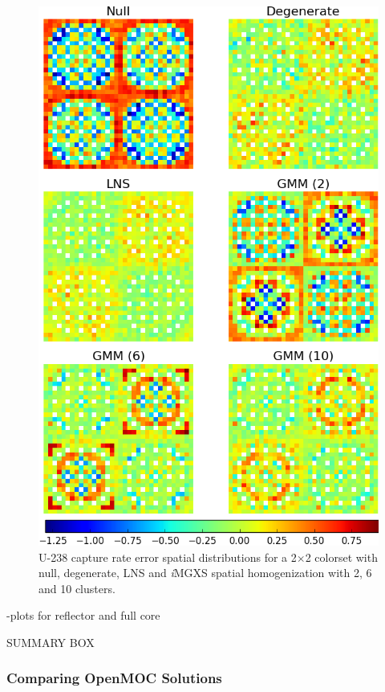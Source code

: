 \begin{figure}[h!]
\centering
\includegraphics[width=0.9\linewidth]{figures/results/spatial/2x2/capt-err}
\vspace{2mm}
\caption[U-238 capture rate errors for a 2$\times$2 colorset]{U-238 capture rate error spatial distributions for a 2$\times$2 colorset with null, degenerate, \ac{LNS} and \textit{i}\ac{MGXS} spatial homogenization with 2, 6 and 10 clusters.}
\label{fig:chap11-2x2-capt-rates}
\end{figure}

\clearpage

-plots for reflector and full core

SUMMARY BOX

\subsubsection{Comparing OpenMOC Solutions}
\label{subsec:chap11-imgxs-capt-rates-compare}

